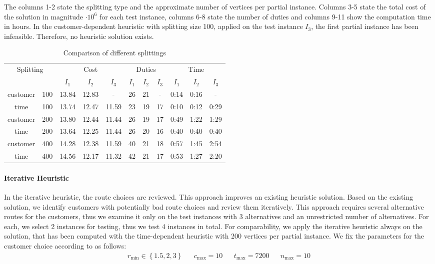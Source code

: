 The columns 1-2 state the splitting type and the approximate number of vertices per partial instance. Columns 3-5 state the total cost of the solution in magnitude $\cdot 10^6$ for each test instance, columns 6-8 state the number of duties and columns 9-11 show the computation time in hours. In the customer-dependent heuristic with splitting size 100, applied on the test instance $I_3$, the first partial instance has been infeasible. Therefore, no heuristic solution exists.

\begin{table}[htb]
	\centering
	\begin{tabular}{cc|ccc|ccc|ccc}
		\toprule
		\multicolumn{2}{c}{Splitting} & \multicolumn{3}{c}{Cost} & \multicolumn{3}{c}{Duties} & \multicolumn{3}{c}{Time} \\
		\cmidrule(r){3-11}
		&& $I_1$ & $I_2$ & $I_3$ & $I_1$ & $I_2$ & $I_3$ & $I_1$ & $I_2$ & $I_3$ \\
		\midrule
		customer & 100  &  13.84 & 12.83 &   -    &  26 & 21 & -   &  0:14 & 0:16 &  -   \\
		time     & 100  &  13.74 & 12.47 & 11.59  &  23 & 19 & 17  &  0:10 & 0:12 & 0:29 \\
		customer & 200  &  13.80 & 12.44 & 11.44  &  26 & 19 & 17  &  0:49 & 1:22 & 1:29 \\
		time     & 200  &  13.64 & 12.25 & 11.44  &  26 & 20 & 16  &  0:40 & 0:40 & 0:40 \\
		customer & 400  &  14.28 & 12.38 & 11.59  &  40 & 21 & 18  &  0:57 & 1:45 & 2:54 \\
		time     & 400  &  14.56 & 12.17 & 11.32  &  42 & 21 & 17  &  0:53 & 1:27 & 2:20 \\
		\bottomrule
	\end{tabular}
	\caption{Comparison of different splittings}
	\label{tab:results:splittings}
\end{table}

\paragraph{Iterative Heuristic} \parfill

In the iterative heuristic, the route choices are reviewed. This approach improves an existing heuristic solution. Based on the existing solution, we identify customers with potentially bad route choices and review them iteratively. This approach requires several alternative routes for the customers, thus we examine it only on the test instances with 3 alternatives and an unrestricted number of alternatives. For each, we select 2 instances for testing, thus we test 4 instances in total. For comparability, we apply the iterative heuristic always on the solution, that has been computed with the time-dependent heuristic with 200 vertices per partial instance. We fix the parameters for the customer choice according to  as follows:
\begin{align*}
	r_{\min} \in\left\{1.5,2,3\right\} && c_{\max} = 10 && t_{\max} = 7200 && n_{\max} = 10
\end{align*}

